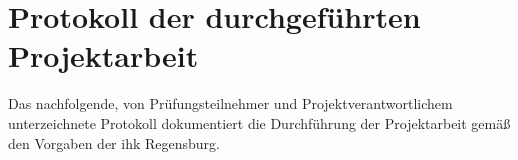 \documentclass[11pt, a4paper, oneside]{report}
\begin{document}
\section{Protokoll der durchgeführten Projektarbeit}
\label{anhang:protokoll}

Das nachfolgende, von Prüfungsteilnehmer und Projektverantwortlichem unterzeichnete
Protokoll dokumentiert die Durchführung der Projektarbeit gemäß den Vorgaben der
\gls{ihk} Regensburg.


\end{document}
